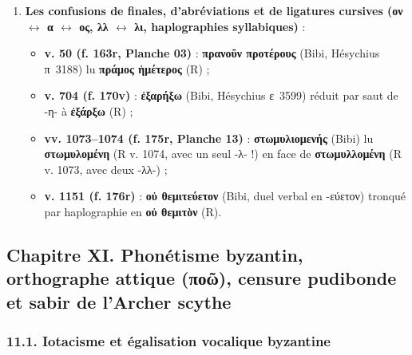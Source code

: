 \documentclass[11pt, a4paper, twoside]{article}
\renewcommand{\_}{\origunderscore\penalty0\relax}
\renewcommand{\texttt}[1]{#1}
\newcommand{\R}{\textbf{R}}
\newcommand{\Bibi}{\textit{Bibi}}
\def\R{R}%
\def\Bibi{Bibi}%
\begin{document}
\begin{enumerate}[leftmargin=1.6em, itemsep=2pt]
  \item \textbf{Les confusions de finales, d'abréviations et de ligatures cursives (ον $\leftrightarrow$ α $\leftrightarrow$ ος, λλ $\leftrightarrow$ λι, haplographies syllabiques)} :
  \begin{itemize}[leftmargin=1.5em, itemsep=2pt]
    \item \textbf{v. 50 (\texttt{f. 163r}, Planche 03)} : \textbf{\texttt{πρανοῦν προτέρους}} (\Bibi{}, Hésychius π~3188) lu \textbf{\texttt{πράμος ἡμέτερος}} (\R{}) ;
    \item \textbf{v. 704 (\texttt{f. 170v})} : \textbf{\texttt{ἐξαρήξω}} (\Bibi{}, Hésychius ε~3599) réduit par saut de -η- à \textbf{\texttt{ἐξάρξω}} (\R{}) ;
    \item \textbf{vv. 1073–1074 (\texttt{f. 175r}, Planche 13)} : \textbf{\texttt{στωμυλιομενής}} (\Bibi{}) lu \textbf{\texttt{στωμυλομένη}} (\R{} v. 1074, avec un seul -λ- !) en face de \textbf{\texttt{στωμυλλομένη}} (\R{} v. 1073, avec deux -λλ-) ;
    \item \textbf{v. 1151 (\texttt{f. 176r})} : \textbf{\texttt{οὐ θεμιτεύετον}} (\Bibi{}, duel verbal en -εύετον) tronqué par haplographie en \textbf{\texttt{οὐ θεμιτὸν}} (\R{}).
  \end{itemize}
\end{enumerate}



\subsection{Chapitre XI. Phonétisme byzantin, orthographe attique (\texttt{ποῶ}), censure pudibonde et sabir de l'Archer scythe}


\subsubsection{11.1. Iotacisme et égalisation vocalique byzantine}
\end{document}
